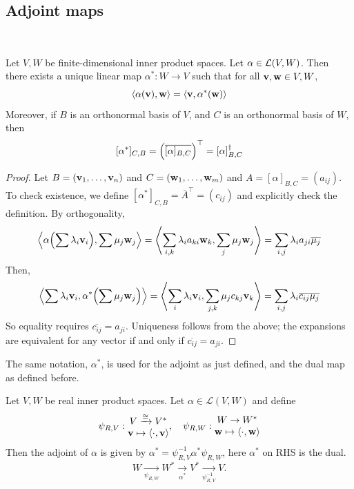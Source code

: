 \documentclass[a4paper,11pt]{article}
\begin{document}
\subsection{Adjoint maps}
\ \vspace*{-1.5em}
\begin{definition}
	Let \( V, W \) be finite-dimensional inner product spaces.
	Let \( \alpha \in {\mathcal{L}}(V, W) \).
	Then there exists a unique linear map \( \alpha^* \colon W \to V \) such that for all \( {\bf v}, {\bf w} \in V, W \),
	\[
		\left\langle{\alpha({\bf v}), {\bf w}}\right\rangle = \left\langle{{\bf v}, \alpha^*({\bf w})}\right\rangle
	\]
	Moreover, if \( B \) is an orthonormal basis of \( V \), and \( C \) is an orthonormal basis of \( W \), then
	\[
		[\alpha^*]_{C, B} = \qty(\overline{[\alpha]_{B, C}})^\top = [\alpha]_{B, C}^\dagger
	\]
\end{definition}
\begin{proof}
	Let \( B = ({\bf v}_1, \dots, {\bf v}_n) \) and \( C = ({\bf w}_1, \dots, {\bf w}_m) \) and \( A = [\alpha]_{B, C} = (a_{ij}) \).
	To check existence, we define \( [\alpha^*]_{C, B} = \overline{A}^\top = (c_{ij}) \) and explicitly check the definition.
	By orthogonality,
	\[
		\left\langle{\alpha\qty(\sum \lambda_i {\bf v}_i), \sum \mu_j {\bf w}_j}\right\rangle = \left\langle{\sum_{i,k} \lambda_i a_{ki} {\bf w}_k, \sum_j \mu_j {\bf w}_j}\right\rangle = \sum_{i,j} \lambda_i a_{ji} \overline{\mu_j}
	\]
	Then,
	\[
		\left\langle{\sum \lambda_i {\bf v}_i, \alpha^*\qty(\sum \mu_j {\bf w}_j)}\right\rangle = \left\langle{\sum_i \lambda_i {\bf v}_i, \sum_{j,k} \mu_j c_{kj} {\bf v}_k}\right\rangle = \sum_{i,j} \lambda_i \overline{c_{ij}} \overline{\mu_j}
	\]
	So equality requires \( \overline{c_{ij}} = a_{ji} \).
	Uniqueness follows from the above; the expansions are equivalent for any vector if and only if \( \overline{c_{ij}} = a_{ji} \).
\end{proof}

\begin{remark}
	The same notation, \( \alpha^* \), is used for the adjoint as just defined, and the dual map as defined before.

	Let $ V,W $ be real inner product spaces. Let $ \alpha\in \mathcal{L}(V,W) $ and define 
	\[
		\psi_{R,V}: \begin{matrix}
			 V \xrightarrow{\cong} V^*\\
			 \mathbf{v} \mapsto \left\langle{\cdot, \mathbf{v}}\right\rangle \\
		\end{matrix},\quad \psi_{R,W}: \begin{matrix}
			 W \to W^*  \\
			 \mathbf{w} \mapsto \left\langle{\cdot,\mathbf{w}}\right\rangle \\
		\end{matrix}
	\]
	Then the adjoint of $\alpha$ is given by $ \alpha^* = \psi_{R,V}^{-1} \alpha^* \psi_{R,W}  $, here $\alpha^* $ on RHS is the dual. 
	\[
		W \xrightarrow[\psi_{R,W}]{} W^* \xrightarrow[\alpha^*]{} V^* \xrightarrow[\psi_{R,V}^{-1}]{} V.
	\]
\end{remark}
\end{document}
